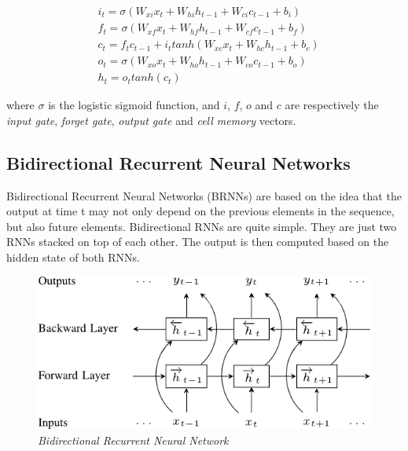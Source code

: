 \documentclass[conference]{IEEEtran}
\begin{document}
\begin{align*}
     &i_t = \sigma (W_{xi}x_t + W_{hi}h_{t-1} + W_{ci}c_{t-1} + b_i) \\
     &f_t = \sigma (W_{xf}x_t + W_{hf}h_{t-1} + W_{cf}c_{t-1} + b_f) \\
     &c_t = f_tc_{t-1} + i_t tanh(W_{xc}x_t + W_{hc}h_{t-1} + b_c) \\
     &o_t = \sigma (W_{xo}x_t + W_{ho}h_{t-1} + W_{co}c_{t-1} + b_o) \\
     &h_t = o_t tanh(c_t)
\end{align*} 

where $\sigma$ is the logistic sigmoid function, and $i$, $f$, $o$ and $c$ are respectively the \textit{input gate}, \textit{forget gate}, \textit{output gate} and \textit{cell memory} vectors.

\subsection{Bidirectional Recurrent Neural Networks}
Bidirectional Recurrent Neural Networks (BRNNs) are based on the idea that the output at time t may not only depend on the previous elements in the sequence, but also future elements. Bidirectional RNNs are quite simple. They are just two RNNs stacked on top of each other. The output is then computed based on the hidden state of both RNNs.

\begin{figure}[h]
\includegraphics[scale=0.4]{brnn.png}
\centering
\caption{\textit{Bidirectional Recurrent Neural Network}}
\end{figure}

\end{document}
